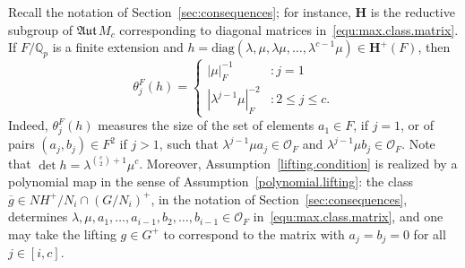 \documentclass[11pt,a4paper]{amsart}
\theoremstyle{plain}
\theoremstyle{remark}
\newcommand{\Q}{\mathbb{Q}}
\def \aAut {\mathfrak{Aut} \,}
\begin{document}
Recall the notation of Section~\ref{sec:consequences}; 
for instance, $\mathbf{H}$ is the reductive subgroup of $\aAut M_c$ corresponding to diagonal matrices in~\eqref{equ:max.class.matrix}.
If $F/\Q_p$ is a finite extension and $h = \mathrm{diag}(\lambda, \mu, \lambda \mu, \dots, \lambda^{c-1} \mu) \in \mathbf{H}^+(F)$, then 
\begin{equation*}
\theta_j^F (h) = 
\begin{cases}
| \mu |_F^{-1} &: j = 1 \\ 
| \lambda^{j-1} \mu |^{-2}_F &: 2 \leq j \leq c.
\end{cases}
\end{equation*}
Indeed, $\theta^F_j (h)$ measures the size of the set of elements $a_1 \in F$, if $j = 1$, or of pairs $(a_j, b_j) \in F^2$ if $j > 1$, such that $\lambda^{j-1} \mu a_j \in \mathcal{O}_F$ and $\lambda^{j-1} \mu b_j \in \mathcal{O}_F$.  Note that $\det h = \lambda^{\binom{c}{2} + 1} \mu^c$.
Moreover, Assumption~\ref{lifting.condition} is realized by a polynomial map in the sense of Assumption~\ref{polynomial.lifting}: the class $\overline{g} \in NH^+ / N_i \cap (G/N_i)^+$, in the notation of Section~\ref{sec:consequences}, determines $\lambda, \mu, a_1, \dots, a_{i-1}, b_2, \dots, b_{i-1} \in \mathcal{O}_F$ in~\eqref{equ:max.class.matrix}, and one may take the lifting $g \in G^+$ to correspond to the matrix with $a_j = b_j = 0$ for all $j \in [i,c]$.  
\end{document}
